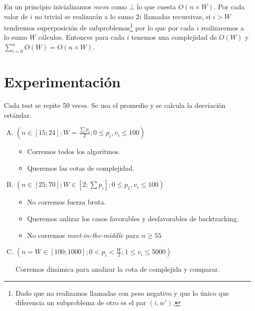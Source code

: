 \documentclass[fleqn, 11pt]{article}
\begin{document}
En un principio inicializamos $mem$ como $\bot$ lo que cuesta $O(n \times W)$.
Por cada valor de $i$ no trivial se realizarán a lo sumo $2i$ llamadas
recursivas, si $i > W$ tendremos superposición de subproblemas\footnote{Dado
que no realizamos llamadas con peso negativo y que lo único que diferencia un
subproblema de otro es el par $(i, w')$.} por lo que por cada $i$
realizaremos a lo sumo $W$ cálculos. Entonces para cada $i$ tenemos una
complejidad de $O(W)$ y $\sum_{i=0}^{n} O(W) = O(n \times W)$.

\section{Experimentación}

Cada test se repite 50 veces. Se usa el promedio y se calcula la desviación
estándar.

\begin{enumerate}[A.]
\item $(n \in [15; 24];
	W=\frac{\sum p_i}{2};
	0 \leq p_i, v_i \leq 100)$

\begin{itemize}
	\item Corremos todos los algoritmos.
\item Queremos las cotas de complejidad.
\end{itemize}

\item $(n \in [25; 70];
	W \in [2; \sum p_i];
	0 \leq p_1, v_i \leq 100)$

\begin{itemize}
\item No corremos fuerza bruta.
\item Queremos anlizar los casos favorables y desfavorables de backtracking.
\item No corremos \emph{meet-in-the-middle} para $n \geq 55$
\end{itemize}

\item $(n = W \in [100; 1000];
        0 < p_i < \frac{W}{2};
        1 \leq v_i \leq 5000)$

Corremos dinámica para analizar la cota de complejida y comparar.
\end{enumerate}
\end{document}
